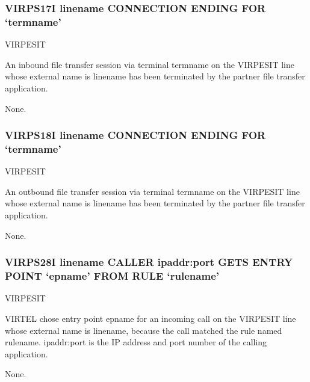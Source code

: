 \documentclass[letterpaper,10pt,english]{sphinxmanual}
\begin{document}
\subsubsection{VIRPS17I linename CONNECTION ENDING FOR ‘termname’}
\label{\detokenize{messages:virps17i-linename-connection-ending-for-termname}}\begin{description}
\sphinxAtStartPar
VIRPESIT

\sphinxAtStartPar
An inbound file transfer session via terminal termname on the VIRPESIT line whose external name is linename has been terminated by the partner file transfer application.

\sphinxAtStartPar
None.

\end{description}


\subsubsection{VIRPS18I linename CONNECTION ENDING FOR ‘termname’}
\label{\detokenize{messages:virps18i-linename-connection-ending-for-termname}}\begin{description}
\sphinxAtStartPar
VIRPESIT

\sphinxAtStartPar
An outbound file transfer session via terminal termname on the VIRPESIT line whose external name is linename has been terminated by the partner file transfer application.

\sphinxAtStartPar
None.

\end{description}


\subsubsection{VIRPS28I linename CALLER ipaddr:port GETS ENTRY POINT ‘epname’ FROM RULE ‘rulename’}
\label{\detokenize{messages:virps28i-linename-caller-ipaddr-port-gets-entry-point-epname-from-rule-rulename}}\begin{description}
\sphinxAtStartPar
VIRPESIT

\sphinxAtStartPar
VIRTEL chose entry point epname for an incoming call on the VIRPESIT line whose external name is linename, because the call matched the rule named rulename. ipaddr:port is the IP address and port number of the calling application.

\sphinxAtStartPar
None.

\end{description}
\end{document}

